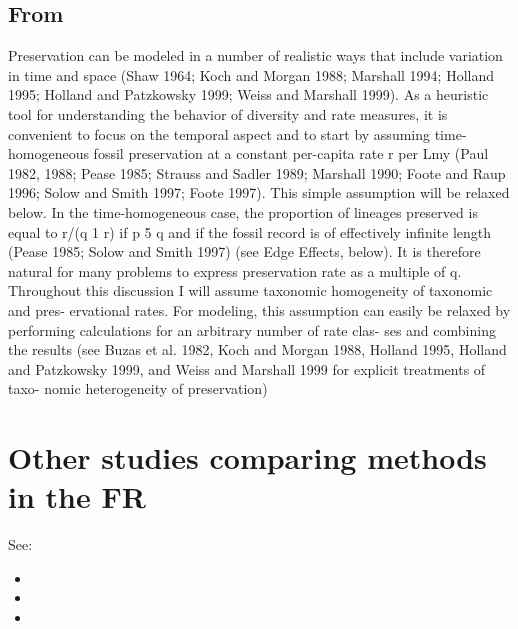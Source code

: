 \documentclass[12pt,twoside,a4paper,pdftex]{scrbook}
\begin{document}
\subsection{From \cite{Foote00}}

Preservation can be modeled in a number of realistic ways that include variation in time and space (Shaw 1964; Koch and Morgan 1988; Marshall 1994; Holland 1995; Holland and Patzkowsky 1999; Weiss and Marshall 1999). As a heuristic tool for understanding the behavior of diversity and rate measures, it is convenient to focus on the temporal aspect and to start by assuming time-homogeneous fossil preservation at a constant per-capita rate r per Lmy (Paul 1982, 1988; Pease 1985; Strauss and Sadler 1989; Marshall 1990; Foote and Raup 1996; Solow and Smith 1997; Foote 1997). This simple assumption will be relaxed below. In the time-homogeneous case, the proportion of lineages preserved is equal to r/(q 1 r) if p 5 q and if the fossil record is of effectively infinite length (Pease 1985; Solow and Smith 1997) (see Edge Effects, below). It is therefore natural for many problems to express preservation rate as a multiple of q. Throughout this discussion I will assume taxonomic homogeneity of taxonomic and pres- ervational rates. For modeling, this assumption can easily be relaxed by performing calculations for an arbitrary number of rate clas- ses and combining the results (see Buzas et al. 1982, Koch and Morgan 1988, Holland 1995, Holland and Patzkowsky 1999, and Weiss and Marshall 1999 for explicit treatments of taxo- nomic heterogeneity of preservation)



\section{Other studies comparing methods in the FR}

See:

\begin{itemize} 
\item {}
\item {}
\item {}
\end{itemize}




\singlespacing 


\end{document}

